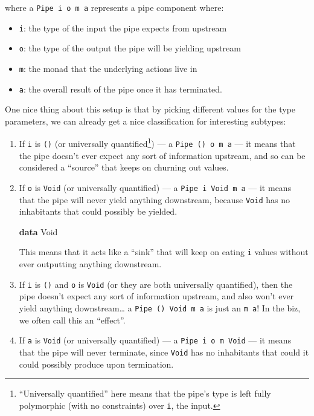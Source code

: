 \documentclass[]{article}
\newenvironment{Shaded}{}{}
\newcommand{\DataTypeTok}[1]{\textcolor[rgb]{0.56,0.13,0.00}{#1}}
\newcommand{\KeywordTok}[1]{\textcolor[rgb]{0.00,0.44,0.13}{\textbf{#1}}}
\begin{document}
where a \texttt{Pipe\ i\ o\ m\ a} represents a pipe component where:

\begin{itemize}
\tightlist
\item
  \texttt{i}: the type of the input the pipe expects from upstream
\item
  \texttt{o}: the type of the output the pipe will be yielding upstream
\item
  \texttt{m}: the monad that the underlying actions live in
\item
  \texttt{a}: the overall result of the pipe once it has terminated.
\end{itemize}

One nice thing about this setup is that by picking different values for the type
parameters, we can already get a nice classification for interesting subtypes:

\begin{enumerate}
\def\labelenumi{\arabic{enumi}.}
\item
  If \texttt{i} is \texttt{()} (or universally quantified\footnote{``Universally
    quantified'' here means that the pipe's type is left fully polymorphic (with
    no constraints) over \texttt{i}, the input.}) --- a
  \texttt{Pipe\ ()\ o\ m\ a} --- it means that the pipe doesn't ever expect any
  sort of information upstream, and so can be considered a ``source'' that keeps
  on churning out values.
\item
  If \texttt{o} is \texttt{Void} (or universally quantified) --- a
  \texttt{Pipe\ i\ Void\ m\ a} --- it means that the pipe will never yield
  anything downstream, because \texttt{Void} has no inhabitants that could
  possibly be yielded.

\begin{Shaded}
\begin{Highlighting}[]
\KeywordTok{data} \DataTypeTok{Void}
\end{Highlighting}
\end{Shaded}

  This means that it acts like a ``sink'' that will keep on eating \texttt{i}
  values without ever outputting anything downstream.
\item
  If \texttt{i} is \texttt{()} and \texttt{o} is \texttt{Void} (or they are both
  universally quantified), then the pipe doesn't expect any sort of information
  upstream, and also won't ever yield anything downstream\ldots{} a
  \texttt{Pipe\ ()\ Void\ m\ a} is just an \texttt{m\ a}! In the biz, we often
  call this an ``effect''.
\item
  If \texttt{a} is \texttt{Void} (or universally quantified) --- a
  \texttt{Pipe\ i\ o\ m\ Void} --- it means that the pipe will never terminate,
  since \texttt{Void} has no inhabitants that could it could possibly produce
  upon termination.
\end{enumerate}
\end{document}
